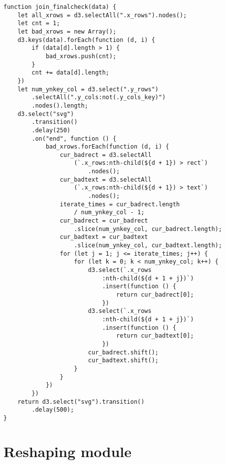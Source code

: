 \begin{lstlisting}
function join_finalcheck(data) {
    let all_xrows = d3.selectAll(".x_rows").nodes();
    let cnt = 1;
    let bad_xrows = new Array();
    d3.keys(data).forEach(function (d, i) {
        if (data[d].length > 1) {
            bad_xrows.push(cnt);
        }
        cnt += data[d].length;
    })
    let num_ynkey_col = d3.select(".y_rows")
        .selectAll(".y_cols:not(.y_cols_key)")
        .nodes().length;
    d3.select("svg")
        .transition()
        .delay(250)
        .on("end", function () {
            bad_xrows.forEach(function (d, i) {
                cur_badrect = d3.selectAll
                    (`.x_rows:nth-child(${d + 1}) > rect`)
                        .nodes();
                cur_badtext = d3.selectAll
                    (`.x_rows:nth-child(${d + 1}) > text`)
                        .nodes();
                iterate_times = cur_badrect.length 
                    / num_ynkey_col - 1;
                cur_badrect = cur_badrect
                    .slice(num_ynkey_col, cur_badrect.length);
                cur_badtext = cur_badtext
                    .slice(num_ynkey_col, cur_badtext.length);
                for (let j = 1; j <= iterate_times; j++) {
                    for (let k = 0; k < num_ynkey_col; k++) {
                        d3.select(`.x_rows
                            :nth-child(${d + 1 + j})`)
                            .insert(function () {
                                return cur_badrect[0];
                            })
                        d3.select(`.x_rows
                            :nth-child(${d + 1 + j})`)
                            .insert(function () {
                                return cur_badtext[0];
                            })
                        cur_badrect.shift();
                        cur_badtext.shift();
                    }
                }
            })
        })
    return d3.select("svg").transition()
        .delay(500);
}
\end{lstlisting}

\section{Reshaping module}

